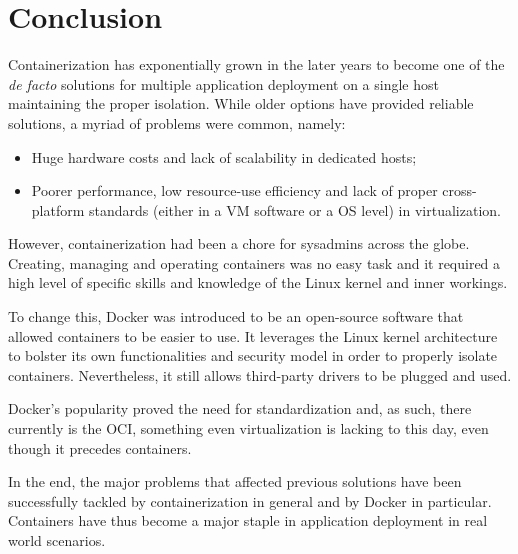 \section{Conclusion}
\label{sec::conc}



Containerization has exponentially grown in the later years to become one of the \textit{de facto} solutions for multiple application deployment on a single host maintaining the proper isolation. While older options have provided reliable solutions, a myriad of problems were common, namely:

\begin{itemize}
	\item Huge hardware costs and lack of scalability in dedicated hosts;
	\item Poorer performance, low resource-use efficiency and lack of proper cross-platform standards (either in a \acs{VM} software or a \acs{OS} level) in virtualization.
\end{itemize}

However, containerization had been a chore for sysadmins across the globe. Creating, managing and operating containers was no easy task and it required a high level of specific skills and knowledge of the Linux kernel and inner workings.

To change this, Docker was introduced to be an open-source software that allowed containers to be easier to use. It leverages the Linux kernel architecture to bolster its own functionalities and security model in order to properly isolate containers. Nevertheless, it still allows third-party drivers to be plugged and used.

Docker's popularity proved the need for standardization and, as such, there currently is the \acf{OCI}, something even virtualization is lacking to this day, even though it precedes containers. 

In the end, the major problems that affected previous solutions have been successfully tackled by containerization in general and by Docker in particular. Containers have thus become a major staple in application deployment in real world scenarios.
